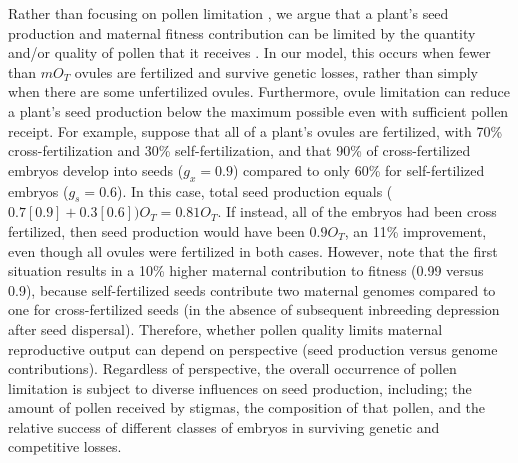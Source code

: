 \documentclass[letterpaper,titlepage]{scrartcl}
\begin{document}
Rather than focusing on pollen limitation \citep{Ashman04a}, we argue
that a plant's seed production and maternal fitness contribution can
be limited by the quantity and/or quality of pollen that it receives
\citep{Ramsey00}. In our model, this occurs when fewer than $mO_{T}$
ovules are fertilized and survive genetic losses, rather than simply
when there are some unfertilized ovules. Furthermore, ovule limitation
can reduce a plant's seed production below the maximum possible even
with sufficient pollen receipt. For example, suppose that all of a
plant's ovules are fertilized, with 70\% cross-fertilization and 30\%
self-fertilization, and that 90\% of cross-fertilized embryos develop
into seeds ($g_{x}=0.9$) compared to only 60\% for self-fertilized
embryos ($g_{s}=0.6$). In this case, total seed production equals
($0.7[0.9]+0.3[0.6])O_{T}=0.81O_{T}$. If instead, all of the embryos
had been cross fertilized, then seed production would have been
$0.9O_{T}$, an 11\% improvement, even though all ovules were
fertilized in both cases. However, note that the first situation
results in a 10\% higher maternal contribution to fitness (0.99 versus
0.9), because self-fertilized seeds contribute two maternal genomes
compared to one for cross-fertilized seeds (in the absence of
subsequent inbreeding depression after seed dispersal). Therefore,
whether pollen quality limits maternal reproductive output can depend
on perspective (seed production versus genome
contributions). Regardless of perspective, the overall occurrence of
pollen limitation is subject to diverse influences on seed production,
including; the amount of pollen received by stigmas, the composition
of that pollen, and the relative success of different classes of
embryos in surviving genetic and competitive losses.
\end{document}
